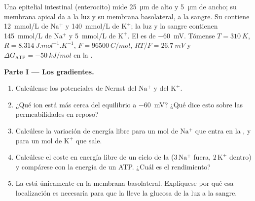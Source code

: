 \begin{problem}
\label{pb:b1:membranes-transport:1}
Una  epitelial intestinal (enterocito) mide \qty{25}{\micro m} de alto
y \qty{5}{\micro m} de ancho; su membrana apical da a la luz y su membrana
basolateral, a la sangre. Su  contiene \qty{12}{mmol/L} de
$\mathrm{Na^+}$ y \qty{140}{mmol/L} de $\mathrm{K^+}$; la luz y la sangre
contienen \qty{145}{mmol/L} de $\mathrm{Na^+}$ y \qty{5}{mmol/L} de
$\mathrm{K^+}$. El  es de \qty{-60}{mV}. Tómense
$T = \qty{310}{K}$, $R = \qty{8.314}{J.mol^{-1}.K^{-1}}$,
$F = \qty{96500}{C/mol}$, $RT/F = \qty{26.7}{mV}$ y
$\Delta G_{\text{ATP}} = \qty{-50}{kJ/mol}$ en la .

\medskip
\noindent\textbf{Parte I --- Los gradientes.}
\begin{enumerate}
  \item Calcúlense los potenciales de Nernst del $\mathrm{Na^+}$ y del
        $\mathrm{K^+}$.
  \item ¿Qué ion está más cerca del equilibrio a \qty{-60}{mV}? ¿Qué dice
        esto sobre las permeabilidades en reposo?
  \item Calcúlese la variación de energía libre para un mol de
        $\mathrm{Na^+}$ que entra en la , y para un mol de
        $\mathrm{K^+}$ que sale.
  \item Calcúlese el coste en energía libre de un ciclo de la 
        ($3\,\mathrm{Na^+}$ fuera, $2\,\mathrm{K^+}$ dentro) y compárese
        con la energía de un ATP. ¿Cuál es el rendimiento?
  \item La  está únicamente en la membrana basolateral. Explíquese por
        qué esa localización es necesaria para que la  lleve la
        glucosa de la luz a la sangre.
\end{enumerate}


\end{problem}
